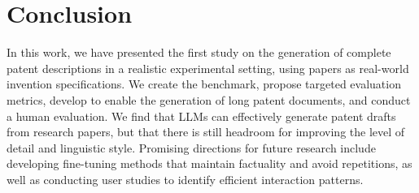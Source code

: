 \section{Conclusion}

In this work, we have presented the first study on the generation of complete patent descriptions in a realistic experimental setting, using papers as real-world invention specifications.
We create the \DatasetName{} benchmark, propose targeted evaluation metrics, develop \MethodName to enable the generation of long patent documents, and conduct a human evaluation.
We find that LLMs can effectively generate patent drafts from research papers, but that there is still headroom for improving the level of detail and linguistic style.
Promising directions for future research include developing fine-tuning methods that maintain factuality and avoid repetitions, as well as conducting user studies to identify efficient interaction patterns.
